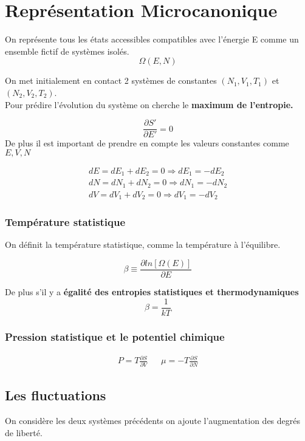 \chapter{Représentation Microcanonique}


On représente tous les états accessibles compatibles avec l'énergie E comme un ensemble fictif de systèmes isolés. 
$$\Omega (E,N)$$

On met initialement en contact 2 systèmes de constantes $(N_1, V_1, T_1)$ et $(N_2, V_2, T_2)$. \\

Pour prédire l'évolution du système on cherche le \textbf{maximum de l'entropie.}

$$\frac{\partial S'}{\partial E'}=0$$
De plus il est important de prendre en compte les valeurs constantes comme $E,V,N$

\begin{align*}
dE= dE_1 + dE_2=0 \Rightarrow dE_1= -dE_2 \\
dN= dN_1 + dN_2=0 \Rightarrow dN_1= -dN_2 \\
dV= dV_1 + dV_2=0 \Rightarrow dV_1= -dV_2
\end{align*}

\subsection{Température statistique}

On définit la température statistique, comme la température à l'équilibre.

$$\beta \equiv \frac{\partial ln[\Omega(E)]}{\partial E}$$

De plus s'il y a \textbf{égalité des entropies statistiques et thermodynamiques}
$$ \beta=\frac{1}{kT}$$

\subsection{Pression statistique et le potentiel chimique}

\begin{align*}
	P= T \frac{\partial S}{\partial V} & &
	\mu= -T \frac{\partial S}{\partial N}
\end{align*}


\section{Les fluctuations}


On considère les deux systèmes précédents on ajoute l'augmentation des degrés de liberté. 

